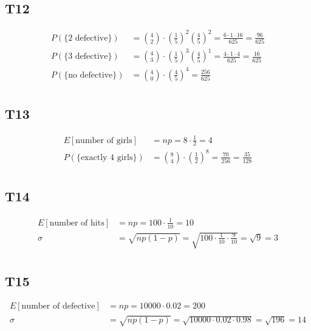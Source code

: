 \documentclass[12pt, a4paper]{article}
\begin{document}
\subsection* {T12}
\begin{align*}
    P(\{ \text{2 defective} \}) &= \binom{4}{2} \cdot \left(\frac{1}{5}\right)^2 \left(\frac{4}{5}\right)^2 = \frac{6 \cdot 1 \cdot 16}{625} = \frac{96}{625} \\
    P(\{ \text{3 defective} \}) &= \binom{4}{3} \cdot \left(\frac{1}{5}\right)^3 \left(\frac{4}{5}\right)^1 = \frac{4 \cdot 1 \cdot 4}{625} = \frac{16}{625} \\
    P(\{ \text{no defective} \}) &= \binom{4}{0} \cdot \left(\frac{4}{5}\right)^4 = \frac{256}{625} \\
\end{align*}

\subsection* {T13}
\begin{align*}
    E[\text{number of girls}] &= np = 8 \cdot \frac{1}{2} = 4 \\
    P(\{ \text{exactly 4 girls} \}) &= \binom{8}{4} \cdot \left(\frac{1}{2}\right)^8 = \frac{70}{256} = \frac{35}{128} \\
\end{align*}


\subsection* {T14}
\begin{align*}
    E[\text{number of hits}] &= np = 100 \cdot \frac{1}{10} = 10 \\
    \sigma &= \sqrt{np(1-p)} = \sqrt{100 \cdot \frac{1}{10} \cdot \frac{9}{10}} = \sqrt{9} = 3 \\
\end{align*}

\subsection* {T15}
\begin{align*}
    E[\text{number of defective}] &= np = 10000 \cdot 0.02 = 200 \\
    \sigma &= \sqrt{np(1-p)} = \sqrt{10000 \cdot 0.02 \cdot 0.98} = \sqrt{196} = 14 \\
\end{align*}

\end{document}
